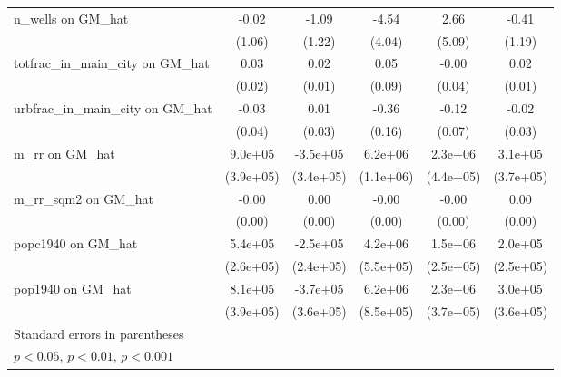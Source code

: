 \begin{table}[htbp]
\begin{tabular}{l*{5}{c}}
\addlinespace
n\_wells on GM\_hat&    -0.02         &    -1.09         &    -4.54         &     2.66         &    -0.41         \\
                &   (1.06)         &   (1.22)         &   (4.04)         &   (5.09)         &   (1.19)         \\
\addlinespace
totfrac\_in\_main\_city on GM\_hat&     0.03         &     0.02         &     0.05         &    -0.00         &     0.02         \\
                &   (0.02)         &   (0.01)         &   (0.09)         &   (0.04)         &   (0.01)         \\
\addlinespace
urbfrac\_in\_main\_city on GM\_hat&    -0.03         &     0.01         &    -0.36\sym{*}  &    -0.12         &    -0.02         \\
                &   (0.04)         &   (0.03)         &   (0.16)         &   (0.07)         &   (0.03)         \\
\addlinespace
m\_rr on GM\_hat  &  9.0e+05\sym{*}  & -3.5e+05         &  6.2e+06\sym{***}&  2.3e+06\sym{***}&  3.1e+05         \\
                &(3.9e+05)         &(3.4e+05)         &(1.1e+06)         &(4.4e+05)         &(3.7e+05)         \\
\addlinespace
m\_rr\_sqm2 on GM\_hat&    -0.00         &     0.00\sym{*}  &    -0.00         &    -0.00         &     0.00         \\
                &   (0.00)         &   (0.00)         &   (0.00)         &   (0.00)         &   (0.00)         \\
\addlinespace
popc1940 on GM\_hat&  5.4e+05\sym{*}  & -2.5e+05         &  4.2e+06\sym{***}&  1.5e+06\sym{***}&  2.0e+05         \\
                &(2.6e+05)         &(2.4e+05)         &(5.5e+05)         &(2.5e+05)         &(2.5e+05)         \\
\addlinespace
pop1940 on GM\_hat&  8.1e+05\sym{*}  & -3.7e+05         &  6.2e+06\sym{***}&  2.3e+06\sym{***}&  3.0e+05         \\
                &(3.9e+05)         &(3.6e+05)         &(8.5e+05)         &(3.7e+05)         &(3.6e+05)         \\
\bottomrule
\multicolumn{6}{l}{\footnotesize Standard errors in parentheses}\\
\multicolumn{6}{l}{\footnotesize \sym{*} \(p<0.05\), \sym{**} \(p<0.01\), \sym{***} \(p<0.001\)}\\
\end{tabular}
\end{table}

